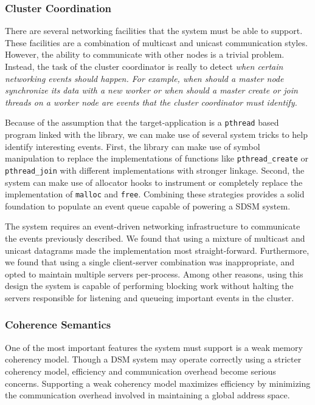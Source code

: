 \subsubsection{Cluster Coordination}
There are several networking facilities that the \projname{} system must be able to support.  These facilities are a combination of multicast and unicast communication styles.  However, the ability to communicate with other nodes is a trivial problem.  Instead, the task of the cluster coordinator is really to detect \em when \em certain networking events should happen.  For example, \em when \em should a master node synchronize its data with a new worker or \em when \em should a master create or join threads on a worker node are events that the cluster coordinator must identify.

Because of the assumption that the target-application is a \verb,pthread, based program linked with the \projname{} library, we can make use of several system tricks to help identify interesting events.  First, the \projname{} library can make use of symbol manipulation to replace the implementations of functions like \verb,pthread_create, or \verb,pthread_join, with different implementations with stronger linkage.  Second, the \projname{} system can make use of allocator hooks to instrument or completely replace the implementation of \verb,malloc, and \verb,free,.  Combining these strategies provides a solid foundation to populate an event queue capable of powering a SDSM system.

The \projname{} system requires an event-driven networking infrastructure to communicate the events previously described.  We found that using a mixture of multicast and unicast datagrams made the implementation most straight-forward.  Furthermore, we found that using a single client-server combination was inappropriate, and opted to maintain multiple servers per-process.  Among other reasons, using this design the \projname{} system is capable of performing blocking work without halting the servers responsible for listening and queueing important events in the cluster.


\subsubsection{Coherence Semantics}
One of the most important features the \projname{} system must support is a weak memory coherency model.  Though a DSM system may operate correctly using a stricter coherency model, efficiency and communication overhead become serious concerns.  Supporting a weak coherency model maximizes efficiency by minimizing the communication overhead involved in maintaining a global address space.

